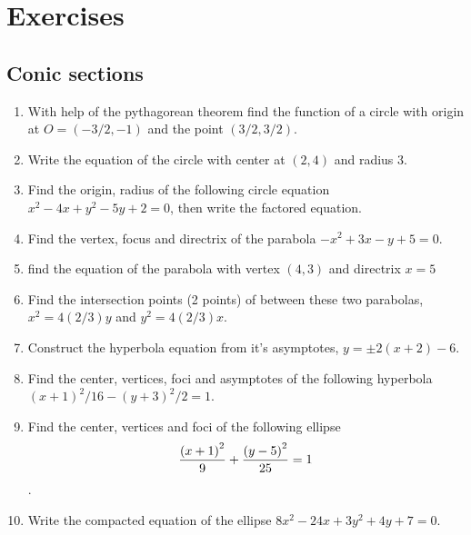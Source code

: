 \documentclass[../main-exe.tex]{subfiles}
\begin{document}
\section{Exercises}

\subsection{Conic sections}
\begin{enumerate}
    \item With help of the pythagorean theorem find the function of a circle with origin at $O=(-3/2,-1)$ and the point $(3/2,3/2)$.
    \item Write the equation of the circle with center at $(2,4)$ and radius $3$.
    \item Find the origin, radius of the following circle equation $x^2-4x+y^2-5y+2=0$, then write the factored equation.

    \item Find the vertex, focus and directrix of the parabola $-x^2+3x-y+5=0$.
    \item find the equation of the parabola with vertex $(4,3)$ and directrix $x=5$
    \item Find the intersection points (2 points) of between these two parabolas, $x^2=4(2/3)y$ and $y^2=4(2/3)x$.

    \item Construct the hyperbola equation from it's asymptotes, $y = \pm 2(x+2)-6$.
    \item Find the center, vertices, foci and asymptotes of the following hyperbola $(x+1)^2/16-(y+3)^2/2=1$.

    \item Find the center, vertices and foci of the following ellipse \[\frac{\qty(x+1)^2}{9} + \frac{\qty(y-5)^2}{25} = 1\].
    \item Write the compacted equation of the ellipse $8x^2-24x+3y^2+4y+7=0$.
\end{enumerate}
\end{document}
